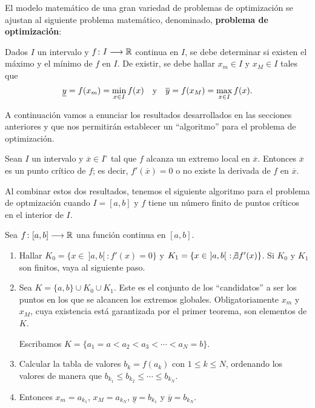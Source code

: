 El modelo matemático de una gran variedad de problemas de optimización se ajustan al siguiente
problema matemático, denominado, \textbf{problema de optimización}:

\begin{probcal}
Dados $I$ un intervalo y $f\colon I\longrightarrow \mathbb{R}$ continua en $I$, se debe determinar si existen el
máximo y el mínimo de $f$ en $I$. De existir, se debe hallar $x_m\in I$ y $x_M\in I$ tales que
\[
\underline{y} = f(x_m) = \min_{x\in I}f(x) \quad\text{y}\quad \overline{y} = f(x_M) = \max_{x\in I}f(x).
\]
\end{probcal}

A continuación vamos a enunciar los resultados desarrollados en las secciones anteriores y que nos
permitirán establecer un ``algoritmo'' para el problema de optimización.

\begin{teocal}
Sean $I$ un intervalo y $\overline{x} \in I^\circ$ tal que $f$ alcanza un extremo local en
$\overline{x}$. Entonces $\overline{x}$ es un punto crítico de $f$; es decir, $f'(\overline{x}) =
0$ o no existe la derivada de $f$ en $\overline{x}$.
\end{teocal}

Al combinar estos dos resultados, tenemos el siguiente algoritmo para el problema de optmización
cuando $I = [a,b]$ y $f$ tiene un número finito de puntos críticos en el interior de $I$.

\begin{algocal}
Sea $f\colon [a,b]\longrightarrow \mathbb{R}$ una función continua en $[a,b]$.
\begin{enumerate}
\item Hallar $K_0 = \{x \in \ ]a,b[ \ : f'(x) = 0\}$ y $K_1 = \{x \in \ ]a,b[ \ : \not\exists
    f'(x)\}$. Si $K_0$ y $K_1$ son finitos, vaya al siguiente paso.

\item Sea $K = \{a,b\} \cup K_0 \cup K_1$. Este es el conjunto de los ``candidatos'' a ser los
    puntos en los que se alcancen los extremos globales. Obligatoriamente $x_m$ y $x_M$, cuya
    existencia está garantizada por el primer teorema, son elementos de $K$.

    Escribamos $K = \{a_1 = a < a_2 < a_3 < \cdots < a_N = b\}$.

\item Calcular la tabla de valores $b_k = f(a_k)$ con $1 \leq k \leq N$, ordenando los valores
    de manera que $b_{k_1} \leq b_{k_2} \leq \cdots \leq b_{k_N}$.

\item Entonces $x_m = a_{k_1}$, $x_M = a_{k_N}$, $\underline{y} = b_{k_1}$ y $\overline{y} = b
    _{k_N}$.
\end{enumerate}
\end{algocal}

